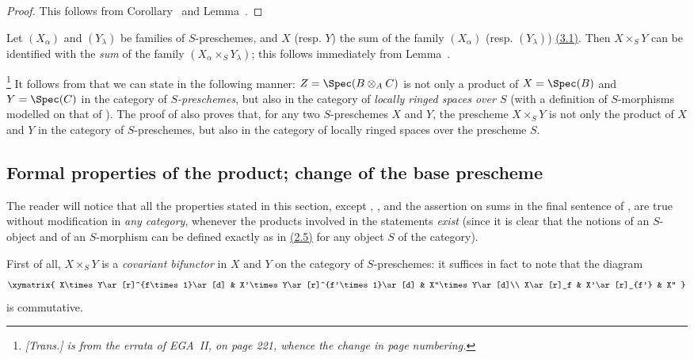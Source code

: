 \begin{proof}
This follows from Corollary~ and Lemma~.
\end{proof}

\begin{env}[3.2.8]
\label{I.3.2.8}
Let $(X_\alpha)$ and $(Y_\lambda)$ be families of $S$-preschemes, and $X$ (resp. $Y$) the sum
of the family $(X_\alpha)$ (resp. $(Y_\lambda)$) \hyperref[subsection:I.3.1]{(3.1)}.
Then $X\times_S Y$ can be identified with the \emph{sum} of the family $(X_\alpha\times_S Y_\lambda)$; this follows immediately from Lemma~.
\end{env}

\begin{env}[3.2.9]
\label{I.3.2.9}
\footnote{\emph{[Trans.]  is from the errata of EGA~II, on page 221, whence the change in page numbering.}}
It follows from  that we can state  in the following
manner: $Z=\Spec(B\otimes_A C)$ is not only a product of $X=\Spec(B)$ and $Y=\Spec(C)$ in the
category of \emph{$S$-preschemes}, but also in the category of \emph{locally ringed spaces
over $S$} (with a definition of $S$-morphisms modelled on that of ). The
proof of  also proves that, for any two $S$-preschemes $X$ and $Y$, the
prescheme $X\times_S Y$ is not only the product of $X$ and $Y$ in the category of
$S$-preschemes, but also in the category of locally ringed spaces over the prescheme $S$.
\end{env}

\subsection{Formal properties of the product; change of the base prescheme}
\label{subsection:I.3.3}

\begin{env}[3.3.1]
\label{I.3.3.1}
The reader will notice that all the properties stated in this section, except
, , and the assertion on sums in the final sentence
of , are true without modification in \emph{any category}, whenever
the products involved in the statements \emph{exist} (since it is
clear that the notions of an $S$-object and of an $S$-morphism can be defined
exactly as in \hyperref[subsection:I.2.5]{(2.5)} for any object $S$ of the category).
\end{env}

\begin{env}[3.3.2]
\label{I.3.3.2}
First of all, $X\times_S Y$ is a \emph{covariant bifunctor} in $X$ and $Y$ on the
category of $S$-preschemes: it suffices in fact to note that the diagram
\[
  \xymatrix{
    X\times Y\ar[r]^{f\times 1}\ar[d] &
    X'\times Y\ar[r]^{f'\times 1}\ar[d] &
    X''\times Y\ar[d]\\
    X\ar[r]_f &
    X'\ar[r]_{f'} &
    X''
  }
\]
is commutative.
\end{env}

